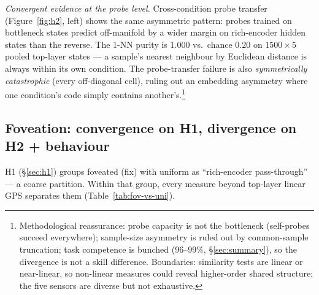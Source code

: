 \documentclass{article}
\begin{document}
\emph{Convergent evidence at the probe level.} Cross-condition probe transfer (Figure~\ref{fig:h2}, left) shows the same asymmetric pattern: probes trained on bottleneck states predict off-manifold by a wider margin on rich-encoder hidden states than the reverse. The 1-NN purity is $1.000$ vs.\ chance $0.20$ on $1500{\times}5$ pooled top-layer states --- a sample's nearest neighbour by Euclidean distance is always within its own condition. The probe-transfer failure is also \emph{symmetrically catastrophic} (every off-diagonal cell), ruling out an embedding asymmetry where one condition's code simply contains another's.\footnote{\small Methodological reassurance: probe capacity is not the bottleneck (self-probes succeed everywhere); sample-size asymmetry is ruled out by common-sample truncation; task competence is bunched ($96$--$99\%$, §\ref{sec:summary}), so the divergence is not a skill difference. Boundaries: similarity tests are linear or near-linear, so non-linear measures could reveal higher-order shared structure; the five sensors are diverse but not exhaustive.}


\subsection{Foveation: convergence on H1, divergence on H2 + behaviour}
\label{sec:foveation}

H1 (§\ref{sec:h1}) groups foveated (fix) with uniform as ``rich-encoder pass-through'' — a coarse partition. Within that group, every measure beyond top-layer linear GPS separates them (Table~\ref{tab:fov-vs-uni}).
\end{document}
